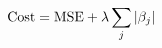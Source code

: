 \documentclass[preview]{standalone}
\begin{document}
\begin{align*}
\special{dvisvgm:raw <g id='unique000'>}\text{Cost} = \text{MSE} + \lambda \sum_j |\beta_j|\special{dvisvgm:raw </g>}
\end{align*}
\end{document}
